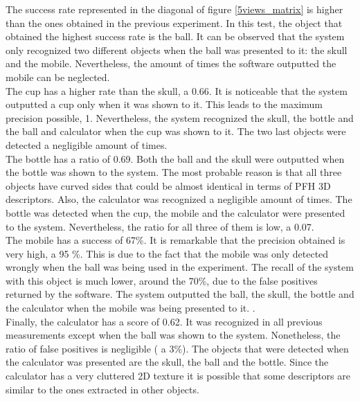 	The success rate represented in the diagonal of figure \ref{5views_matrix} is higher than the ones obtained in the previous experiment. 
	In this test, the object that obtained the highest success rate is the ball. 
	It can be observed that the system only recognized two different objects when the ball was presented to it: the skull and the mobile. 
	Nevertheless, the amount of times the software outputted the mobile can be neglected. 
	\\

	The cup has a higher rate than the skull, a 0.66. 
	It is noticeable that the system outputted a cup only when it was shown to it. 
	This leads to the maximum precision possible, 1. %
	Nevertheless, the system recognized the skull, the bottle and the ball and calculator when the cup was shown to it. 
	The two last objects were detected a negligible amount of times. \\

	The bottle has a ratio of 0.69. 
	Both the ball and the skull were outputted when the bottle was shown to the system. 
	The most probable reason is that all three objects have curved sides that could be almost identical in terms of PFH 3D descriptors. 
	Also, the calculator was recognized a negligible amount of times. 
	The bottle was detected when the cup, the mobile and the calculator were presented to the system. 
	Nevertheless, the ratio for all three of them is low, a 0.07. 
	\\

	The mobile has a success of 67\%. 
	It is remarkable that the precision obtained is very high, a 95 \%. 
	This is due to the fact that the mobile was only detected wrongly when the ball was being used in the experiment. 
	The recall of the system with this object is much lower, around the 70\%, due to the false positives returned by the software. 
	The system outputted the ball, the skull, the bottle and the calculator when the mobile was being presented to it. . 
	\\

	Finally, the calculator has a score of 0.62. 
	It was recognized in all previous measurements except when the ball was shown to the system. 
	Nonetheless, the ratio of false positives is negligible ( a 3\%). 
	The objects that were detected when the calculator was presented are the skull, the ball and the bottle. 
	Since the calculator has a very cluttered 2D texture it is possible that some descriptors are similar to the ones extracted in other objects. 
	\\

